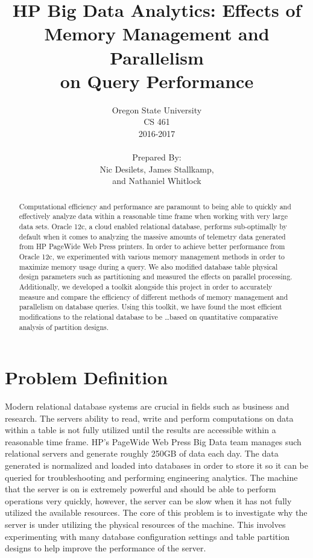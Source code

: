 \documentclass[draftclsnofoot, onecolumn, 10pt]{IEEEtran}
\title{\huge HP Big Data Analytics: Effects of\\Memory Management and Parallelism\\on Query Performance}
\author{Oregon State University\\CS 461\\2016-2017\\\\Prepared By:\\Nic Desilets, James Stallkamp,\\and Nathaniel Whitlock}
\begin{document}
\begin{titlingpage}
    \maketitle 
    \begin{abstract}
		\noindent Computational efficiency and performance are paramount to being able to quickly and effectively analyze data within a reasonable time frame when working with very large data sets. 
		Oracle 12c, a cloud enabled relational database, performs sub-optimally by default when it comes to analyzing the massive amounts of telemetry data generated from HP PageWide Web Press printers.
		In order to achieve better performance from Oracle 12c, we experimented with various memory management methods in order to maximize memory usage during a query.
		We also modified database table physical design parameters such as partitioning and measured the effects on parallel processing.
		Additionally, we developed a toolkit alongside this project in order to accurately measure and compare the efficiency of different methods of memory management and parallelism on database queries.
		Using this toolkit, we have found the most efficient modifications to the relational database to be \ldots based on quantitative comparative analysis of partition designs.
    \end{abstract}
\end{titlingpage}


\section*{Problem Definition}
Modern relational database systems are crucial in fields such as business and research.
The servers ability to read, write and perform computations on data within a table is not fully utilized until the results are accessible within a reasonable time frame.
HP’s PageWide Web Press Big Data team manages such relational servers and generate roughly 250GB of data each day.
The data generated is normalized and loaded into databases in order to store it so it can be queried for troubleshooting and performing engineering analytics.
The machine that the server is on is extremely powerful and should be able to perform operations very quickly, however, the server can be slow when it has not fully utilized the available resources.
The core of this problem is to investigate why the server is under utilizing the physical resources of the machine.
This involves experimenting with many database configuration settings and table partition designs to help improve the performance of the server. 
\end{document}
